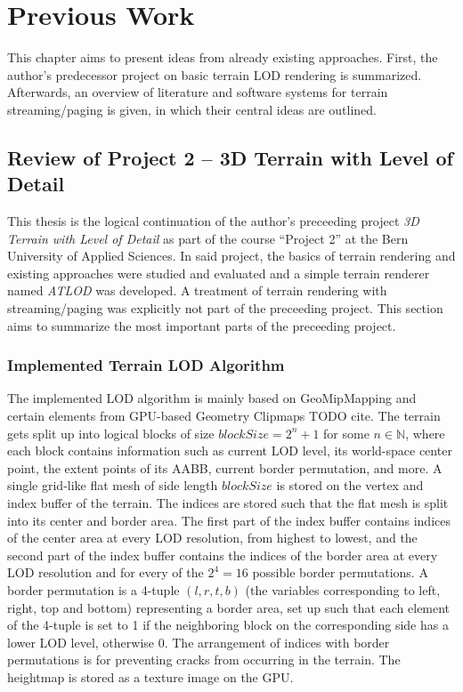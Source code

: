 \chapter{Previous Work}
This chapter aims to present ideas from already existing approaches.
First, the author's 
predecessor project on basic terrain LOD rendering is summarized.
Afterwards, an overview of literature and software systems for terrain streaming/paging is given,
in which their central ideas are outlined.

\section{Review of Project 2 -- 3D Terrain with Level of Detail}
This thesis is the logical continuation of 
the author's preceeding project \textit{3D Terrain with Level of Detail} \cite{p2}
as part of the course ``Project 2'' at the Bern University of Applied Sciences.
In said project, the basics of terrain rendering and existing approaches were 
studied and evaluated and a simple terrain renderer named \textit{ATLOD} was developed.
A treatment of terrain rendering with streaming/paging was explicitly not part of the preceeding project.
This section aims to summarize the most important parts of the preceeding project.

\subsection{Implemented Terrain LOD Algorithm}
The implemented LOD algorithm is mainly based on GeoMipMapping 
and certain elements from GPU-based Geometry Clipmaps TODO cite. 
The terrain gets split up into logical blocks of size $blockSize = 2^n + 1$ for some $n \in \mathbb{N}$,
where each block contains information such as current LOD level, its world-space center point, the extent points of its AABB,
current border permutation, and more.
A single grid-like flat mesh of side length $blockSize$ is stored on the vertex and index buffer of the terrain.
The indices are stored such that the flat mesh is split into its center and border area. The first part of the index buffer 
contains indices of the center area at every LOD resolution, from highest to lowest, 
and the second part of the index buffer contains the indices of the border area 
at every LOD resolution and for every of the $2^4=16$ possible border permutations. 
A border permutation is a 4-tuple $(l,r,t,b)$ (the variables corresponding to left, right, top and bottom) 
representing a border area, set up such that each element of the 4-tuple is set to 1 if the neighboring block 
on the corresponding side has a lower LOD level, otherwise 0. The arrangement 
of indices with border permutations is for preventing cracks from occurring in the terrain.
The heightmap is stored as a texture image on the GPU.

